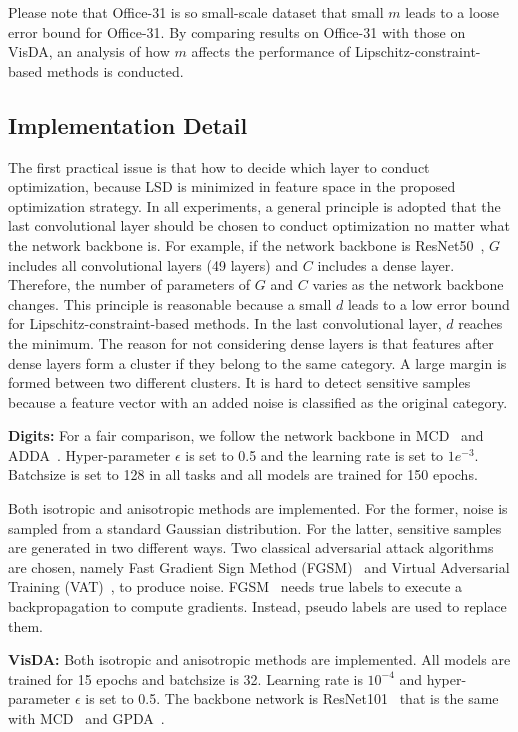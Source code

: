 \documentclass[journal,twocolumn]{IEEEtran}
\theoremstyle{definition}
\begin{document}
Please note that Office-31 is so small-scale dataset that small $m$ leads to a loose error bound for Office-31. By comparing results on Office-31 with those on VisDA, an analysis of how $m$ affects the performance of Lipschitz-constraint-based methods is conducted.

\subsection{Implementation Detail}

The first practical issue is that how to decide which layer to conduct optimization, because LSD is minimized in feature space in the proposed optimization strategy. In all experiments, a general principle is adopted that the last convolutional layer should be chosen to conduct optimization no matter what the network backbone is. For example, if the network backbone is ResNet50~\cite{7780459}, $G$ includes all convolutional layers (49 layers) and $C$ includes a dense layer. Therefore, the number of parameters of $G$ and $C$ varies as the network backbone changes. This principle is reasonable because a small $d$ leads to a low error bound for Lipschitz-constraint-based methods. In the last convolutional layer, $d$ reaches the minimum. The reason for not considering dense layers is that features after dense layers form a cluster if they belong to the same category. A large margin is formed between two different clusters. It is hard to detect sensitive samples because a feature vector with an added noise is classified as the original category.  

{\bf Digits:} For a fair comparison, we follow the network backbone in MCD~\cite{saito2018maximum} and ADDA~\cite{tzeng2017adversarial}. Hyper-parameter $\epsilon$ is set to 0.5 and the learning rate is set to $1e^{-3}$. Batchsize is set to 128 in all tasks and all models are trained for 150 epochs.

Both isotropic and anisotropic methods are implemented. For the former, noise is sampled from a standard Gaussian distribution. For the latter, sensitive samples are generated in two different ways.  Two classical adversarial attack algorithms are chosen, namely Fast Gradient Sign Method (FGSM)~\cite{goodfellow2014explaining} and Virtual Adversarial Training (VAT)~\cite{miyato2018virtual}, to produce noise. FGSM~\cite{goodfellow2014explaining} needs true labels to execute a backpropagation to compute gradients. Instead, pseudo labels are used to replace them. 

{\bf VisDA:} Both isotropic and anisotropic methods are implemented. All models are trained for 15 epochs and batchsize is  32. Learning rate is $10^{-4}$ and hyper-parameter $\epsilon$ is set to 0.5. The backbone network is ResNet101~\cite{7780459} that is the same with MCD~\cite{saito2018maximum} and GPDA~\cite{8953535}.
\end{document}
